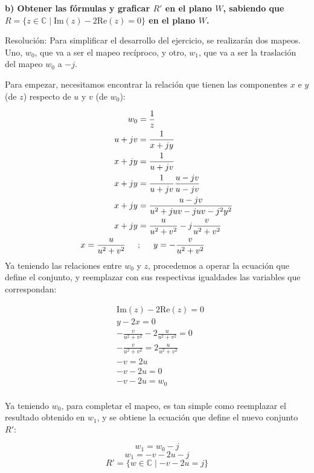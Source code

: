 \documentclass[12pt]{report}
\begin{document}
\textbf{b) Obtener las fórmulas y graficar \( R' \) en el plano \( W \), sabiendo que \( R = \{z \in \mathbb{C} \mid \text{Im}(z) - 2\text{Re}(z) = 0\} \) en el plano \( W \).}

Resolución: Para simplificar el desarrollo del ejercicio, se realizarán dos mapeos. Uno, \( w_0 \), que va a ser el mapeo recíproco, y otro, \( w_1 \), que va a ser la traslación del mapeo \( w_0 \) a \( -j \).

Para empezar, necesitamos encontrar la relación que tienen las componentes \( x \) e \( y \) (de \( z \)) respecto de \( u \) y \( v \) (de \( w_0 \)):

\begin{align*}
    w_0 &=\frac{1}{z}\\
    u+jv &=\frac{1}{x+jy}\\
    x+jy &= \frac{1}{u+jv}\\
    x+jy &= \frac{1}{u+jv} \frac{u-jv}{u-jv}\\
    x+jy &= \frac{u-jv}{u^2+juv-juv-j^2y^2}\\
    x+jy &= \frac{u}{u^2+v^2}-j\frac{v}{u^2+v^2}\\
    x=\frac{u}{u^2+v^2} \hspace{0.5cm} &;\hspace{0.5cm} y=-\frac{v}{u^2+v^2}\\
\end{align*}
Ya teniendo las relaciones entre \( w_0 \) y \( z \), procedemos a operar la ecuación que define el conjunto, y reemplazar con sus respectivas igualdades las variables que correspondan:

\begin{align*}
&\text{Im}(z) - 2\text{Re}(z) = 0\\ 
&y - 2x = 0\\ 
&-\frac{v}{u^2 + v^2} - 2\frac{u}{u^2 + v^2} = 0\\ 
&-\frac{v}{u^2 + v^2} = 2\frac{u}{u^2 + v^2}\\ 
&-v=2u\\
&-v - 2u = 0\\ 
&-v - 2u = w_0\\ 
\end{align*}

Ya teniendo \( w_0 \), para completar el mapeo, es tan simple como reemplazar el resultado obtenido en \( w_1 \), y se obtiene la ecuación que define el nuevo conjunto \( R' \):

$$ w_1 = w_0 - j $$
$$ w_1 = -v - 2u - j $$
$$ R' = \{w \in \mathbb{C} \mid -v - 2u = j\} $$
\end{document}
